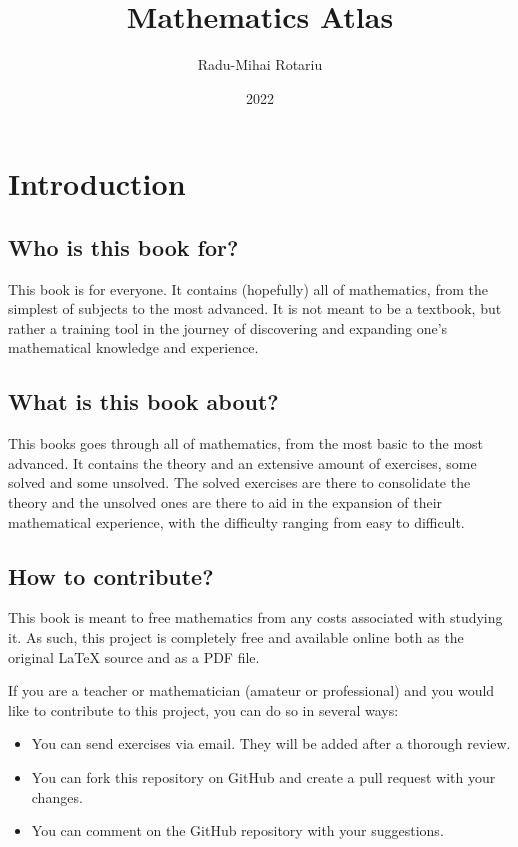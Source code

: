 \documentclass[a4paper]{book}
\title{Mathematics Atlas}
\author{Radu-Mihai Rotariu}
\date{2022}
\begin{document}
\maketitle

\tableofcontents

\chapter{Introduction}
\section{Who is this book for?}
This book is for everyone. It contains (hopefully) all of mathematics, from the simplest of subjects
to the most advanced. It is not meant to be a textbook, but rather a training tool in the journey
of discovering and expanding one's mathematical knowledge and experience.

\section{What is this book about?}
This books goes through all of mathematics, from the most basic to the most advanced. It contains
the theory and an extensive amount of exercises, some solved and some unsolved. The solved exercises
are there to consolidate the theory and the unsolved ones are there to aid in the expansion of their
mathematical experience, with the difficulty ranging from easy to difficult.

\section{How to contribute?}
This book is meant to free mathematics from any costs associated with studying it. As such, this project
is completely free and available online both as the original LaTeX source and as a PDF file.

If you are a teacher or mathematician (amateur or professional) and you would like to contribute to
this project, you can do so in several ways:
\begin{itemize}
    \item You can send exercises via email. They will be added after a thorough review.
    \item You can fork this repository on GitHub and create a pull request with your changes.
    \item You can comment on the GitHub repository with your suggestions.
\end{itemize}
\end{document}
